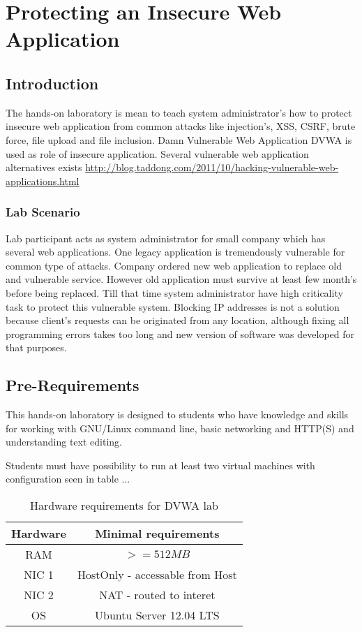\chapter{Protecting an Insecure Web Application}
\label{Protecting an Insecure Web Application}
\section{Introduction}

The hands-on laboratory is mean to teach system administrator's how to protect insecure web application from common attacks like injection's, \gls{XSS}, \gls{CSRF}, brute force, file upload and file inclusion. Damn Vulnerable Web Application \gls{DVWA} is used as role of insecure application. Several vulnerable web application  alternatives exists \url{http://blog.taddong.com/2011/10/hacking-vulnerable-web-applications.html}


\subsection{Lab Scenario}
Lab participant acts as system administrator for small company which has several web applications. One legacy application is tremendously vulnerable for common type of attacks. Company ordered new web application to replace old and vulnerable service. However old application must survive at least few month's before being replaced. Till that time system administrator have high criticality task  to protect this vulnerable system. Blocking IP addresses is not a solution because client's requests can be originated from any location, although fixing all programming errors takes too long and new version of software was developed for that purposes.



\section{Pre-Requirements}
This hands-on laboratory is designed to students who have knowledge and skills for working with GNU/Linux command line, basic networking and HTTP(S) and understanding text editing.
\par
Students must have possibility to run at least two virtual machines with configuration seen in table ...

\begin{table}
\centering
\caption{Hardware requirements for DVWA lab}
\begin{tabular}{|c|c|}
\hline 
\rule[-1ex]{0pt}{2.5ex} Hardware & Minimal requirements \\ 
\hline 
\rule[-1ex]{0pt}{2.5ex} RAM & $>=512MB$ \\ 
\hline 
\rule[-1ex]{0pt}{2.5ex} NIC 1 & HostOnly - accessable from Host \\ 
\hline 
\rule[-1ex]{0pt}{2.5ex} NIC 2 & NAT - routed to interet \\ 
\hline 
\rule[-1ex]{0pt}{2.5ex} OS & Ubuntu Server 12.04 LTS \\ 
\hline 
\end{tabular}
\label{HW for DVWA}
\end{table}


